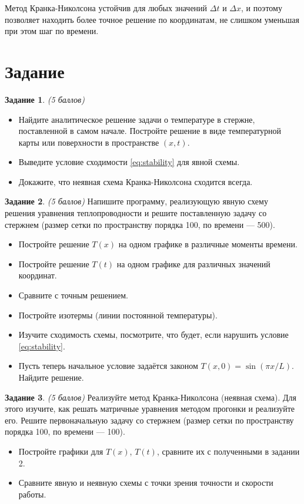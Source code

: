 \documentclass[12pt]{article}
\newcommand{\task}[2]{\vspace{6pt}
\textbf{Задание #1}. #2 %
}
\begin{document}
Метод Кранка-Николсона устойчив для любых значений $\Delta t$ и $\Delta x$, и поэтому позволяет находить более точное решение по координатам, не слишком уменьшая при этом шаг по времени.

\section*{Задание}

\task{1}{\textit{(5 баллов)}} 
\begin{itemize}
\item Найдите аналитическое решение задачи о температуре в стержне, поставленной в самом начале. Постройте решение в виде температурной карты или поверхности в пространстве $(x,t)$.

\item Выведите условие сходимости \eqref{eq:stability} для явной схемы.

\item Докажите, что неявная схема Кранка-Николсона сходится всегда.

\end{itemize}

\task{2}{\textit{(5 баллов)}} Напишите программу, реализующую явную схему решения уравнения теплопроводности и решите поставленную задачу со стержнем (размер сетки по пространству порядка 100, по времени --- 500).
\begin{itemize}
\item Постройте решение $T(x)$ на одном графике в различные моменты времени.
\item Постройте решение $T(t)$ на одном графике для различных значений координат.
\item Сравните с точным решением.
\item Постройте изотермы (линии постоянной температуры).
\item Изучите сходимость схемы, посмотрите, что будет, если нарушить условие \eqref{eq:stability}.
\item Пусть теперь начальное условие задаётся законом $T(x,0)=\sin(\pi x/L)$. Найдите решение.
\end{itemize}

\task{3}{\textit{(5 баллов)}} Реализуйте метод Кранка-Николсона (неявная схема). Для этого изучите, как решать матричные уравнения методом прогонки и реализуйте его. Решите первоначальную задачу со стержнем (размер сетки по пространству порядка 100, по времени --- 100).
\begin{itemize}
\item Постройте графики для $T(x)$, $T(t)$, сравните их с полученными в задании 2.
\item Сравните явную и неявную схемы с точки зрения точности и скорости работы.
\end{itemize}
\end{document}
